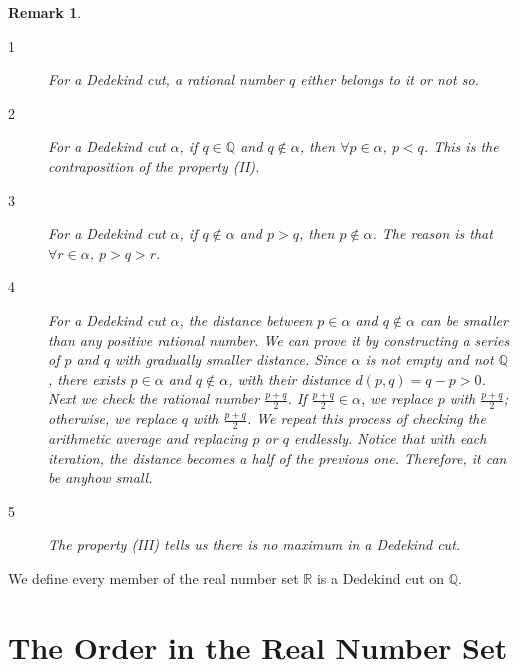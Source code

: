 \documentclass[onecolumn]{article}
\newtheorem{remark}{Remark}
\begin{document}
\begin{remark}
  \begin{description}
    \item[{1}] For a Dedekind cut, a rational number $q$ either belongs to it or 
    not so.
    \item[{2}] For a Dedekind cut $\alpha$, if $q \in \mathbb{Q}$ and 
    $q \notin \alpha$, then $\forall p \in \alpha$, $p < q$. This is the 
    contraposition of the property (II).
    \item[{3}] For a Dedekind cut $\alpha$, if $q \notin \alpha$ and $p > q$, 
    then $p \notin \alpha$. The reason is that $\forall r \in \alpha$, 
    $p > q > r$.
    \item[{4}] For a Dedekind cut $\alpha$, the distance between $p \in \alpha$ 
    and $q \notin \alpha$ can be smaller than any positive rational number. We 
    can prove it by constructing a series of $p$ and $q$ with gradually smaller 
    distance. Since $\alpha$ is not empty and not $\mathbb{Q}$, there exists 
    $p \in \alpha$ and $q \notin \alpha$, with their distance 
    $d(p, q) = q - p > 0$. Next we check the rational number $\frac{p + q}{2}$. 
    If $\frac{p + q}{2} \in \alpha$, we replace $p$ with $\frac{p + q}{2}$; 
    otherwise, we replace $q$ with $\frac{p + q}{2}$. We repeat this process of 
    checking the arithmetic average and replacing $p$ or $q$ endlessly. Notice 
    that with each iteration, the distance becomes a half of the previous one. 
    Therefore, it can be anyhow small.
    \item[{5}] The property (III) tells us there is no maximum in a Dedekind 
    cut.
  \end{description}
\end{remark}

We define every member of the real number set $\mathbb{R}$ is a Dedekind cut on 
$\mathbb{Q}$.

\section{The Order in the Real Number Set}
\end{document}
